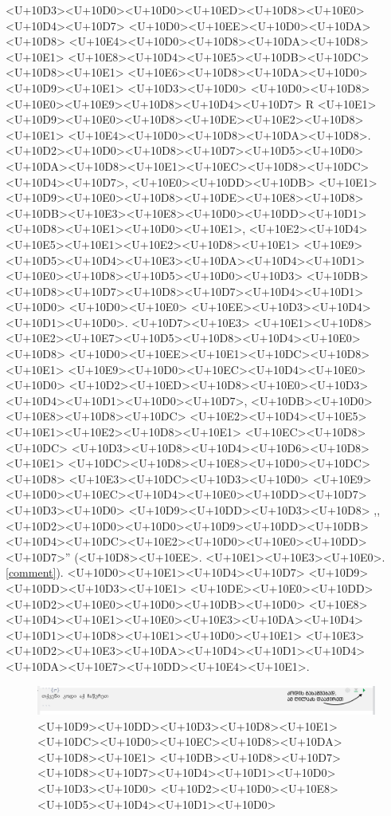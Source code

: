 \documentclass{article}
\begin{document}
<U+10D3><U+10D0><U+10D0><U+10ED><U+10D8><U+10E0><U+10D4><U+10D7> <U+10D0><U+10EE><U+10D0><U+10DA><U+10D8> <U+10E4><U+10D0><U+10D8><U+10DA><U+10D8><U+10E1> <U+10E8><U+10D4><U+10E5><U+10DB><U+10DC><U+10D8><U+10E1> <U+10E6><U+10D8><U+10DA><U+10D0><U+10D9><U+10E1> <U+10D3><U+10D0> <U+10D0><U+10D8><U+10E0><U+10E9><U+10D8><U+10D4><U+10D7> R <U+10E1><U+10D9><U+10E0><U+10D8><U+10DE><U+10E2><U+10D8><U+10E1> <U+10E4><U+10D0><U+10D8><U+10DA><U+10D8>. <U+10D2><U+10D0><U+10D8><U+10D7><U+10D5><U+10D0><U+10DA><U+10D8><U+10E1><U+10EC><U+10D8><U+10DC><U+10D4><U+10D7>, <U+10E0><U+10DD><U+10DB> <U+10E1><U+10D9><U+10E0><U+10D8><U+10DE><U+10E8><U+10D8> <U+10DB><U+10E3><U+10E8><U+10D0><U+10DD><U+10D1><U+10D8><U+10E1><U+10D0><U+10E1>, <U+10E2><U+10D4><U+10E5><U+10E1><U+10E2><U+10D8><U+10E1> <U+10E9><U+10D5><U+10D4><U+10E3><U+10DA><U+10D4><U+10D1><U+10E0><U+10D8><U+10D5><U+10D0><U+10D3> <U+10DB><U+10D8><U+10D7><U+10D8><U+10D7><U+10D4><U+10D1><U+10D0> <U+10D0><U+10E0> <U+10EE><U+10D3><U+10D4><U+10D1><U+10D0>. <U+10D7><U+10E3> <U+10E1><U+10D8><U+10E2><U+10E7><U+10D5><U+10D8><U+10D4><U+10E0><U+10D8> <U+10D0><U+10EE><U+10E1><U+10DC><U+10D8><U+10E1> <U+10E9><U+10D0><U+10EC><U+10D4><U+10E0><U+10D0> <U+10D2><U+10ED><U+10D8><U+10E0><U+10D3><U+10D4><U+10D1><U+10D0><U+10D7>, <U+10DB><U+10D0><U+10E8><U+10D8><U+10DC> <U+10E2><U+10D4><U+10E5><U+10E1><U+10E2><U+10D8><U+10E1> <U+10EC><U+10D8><U+10DC> <U+10D3><U+10D8><U+10D4><U+10D6><U+10D8><U+10E1> <U+10DC><U+10D8><U+10E8><U+10D0><U+10DC><U+10D8> <U+10E3><U+10DC><U+10D3><U+10D0> <U+10E9><U+10D0><U+10EC><U+10D4><U+10E0><U+10DD><U+10D7> <U+10D3><U+10D0> <U+10D9><U+10DD><U+10D3><U+10D8> ,,<U+10D2><U+10D0><U+10D0><U+10D9><U+10DD><U+10DB><U+10D4><U+10DC><U+10E2><U+10D0><U+10E0><U+10DD><U+10D7>'' (<U+10D8><U+10EE>. <U+10E1><U+10E3><U+10E0>. \ref{comment}). <U+10D0><U+10E1><U+10D4><U+10D7> <U+10D9><U+10DD><U+10D3><U+10E1> <U+10DE><U+10E0><U+10DD><U+10D2><U+10E0><U+10D0><U+10DB><U+10D0> <U+10E8><U+10D4><U+10E1><U+10E0><U+10E3><U+10DA><U+10D4><U+10D1><U+10D8><U+10E1><U+10D0><U+10E1> <U+10E3><U+10D2><U+10E3><U+10DA><U+10D4><U+10D1><U+10D4><U+10DA><U+10E7><U+10DD><U+10E4><U+10E1>.

\begin{figure}[h]
\centering
\includegraphics[width=\textwidth]{img/run_chunk.PNG}
\caption{<U+10D9><U+10DD><U+10D3><U+10D8><U+10E1> <U+10DC><U+10D0><U+10EC><U+10D8><U+10DA><U+10D8><U+10E1> <U+10DB><U+10D8><U+10D7><U+10D8><U+10D7><U+10D4><U+10D1><U+10D0> <U+10D3><U+10D0> <U+10D2><U+10D0><U+10E8><U+10D5><U+10D4><U+10D1><U+10D0>}
    \label{chunk}
\end{figure}
\end{document}
